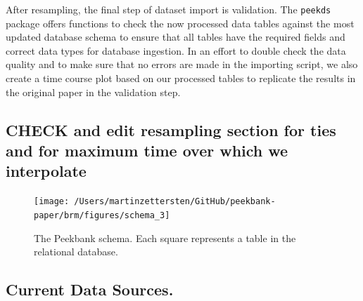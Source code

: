 \documentclass[
  english,
  man,floatsintext]{apa6}
\begin{document}
After resampling, the final step of dataset import is validation.
The \texttt{peekds} package offers functions to check the now processed data tables against the most updated database schema to ensure that all tables have the required fields and correct data types for database ingestion.
In an effort to double check the data quality and to make sure that no errors are made in the importing script, we also create a time course plot based on our processed tables to replicate the results in the original paper in the validation step.

\hypertarget{check-and-edit-resampling-section-for-ties-and-for-maximum-time-over-which-we-interpolate}{%
\subsection{CHECK and edit resampling section for ties and for maximum time over which we interpolate}\label{check-and-edit-resampling-section-for-ties-and-for-maximum-time-over-which-we-interpolate}}

\begin{figure}

{\centering \texttt{[image: /Users/martinzettersten/GitHub/peekbank-paper/brm/figures/schema\_3]} 

}

\caption{The Peekbank schema. Each square represents a table in the relational database.}\label{fig:fig-schema}
\end{figure}

\hypertarget{current-data-sources.}{%
\subsection{Current Data Sources.}\label{current-data-sources.}}
\end{document}
